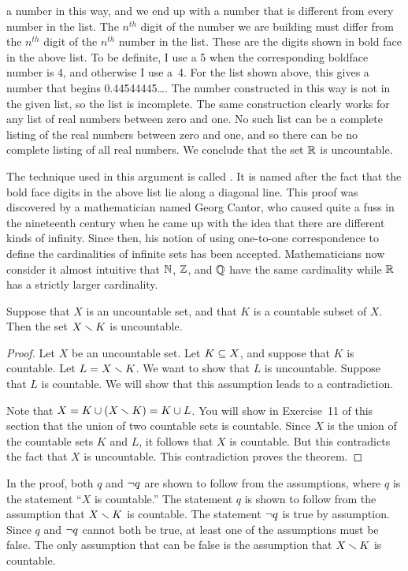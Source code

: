 a number in this way, and we end up with a number that is different
from every number in the list.  The $n^{th}$ digit of the number
we are building must differ from the $n^{th}$ digit of the $n^{th}$ number 
in the list.  These are the digits shown in bold face in the 
above list.  To be definite, I use a 5 when the corresponding
boldface number is 4, and otherwise I use a~4.  For the list
shown above, this gives a number that begins 0.44544445\dots.
The number constructed in this way is not in the given list,
so the list is incomplete.
The same construction clearly works for any list of real numbers
between zero and one.  No such list can be a complete listing
of the real numbers between zero and one, and so there can be
no complete listing of all real numbers.  We conclude that
the set ${\mathbb R}$ is uncountable.

The technique used in this argument is called .
It is named after the fact that the bold face digits in the above
list lie along a diagonal line.   This proof was discovered by
a mathematician named Georg Cantor, who caused quite a fuss in the
nineteenth century when he came up with the idea that there are
different kinds of infinity.  Since then, his notion of using
one-to-one correspondence to define the cardinalities of infinite sets
has been accepted.  Mathematicians now consider it almost intuitive
that ${\mathbb N}$, ${\mathbb Z}$, and ${\mathbb Q}$ have the same cardinality while ${\mathbb R}$
has a strictly larger cardinality.

\medbreak
\begin{theorem}
Suppose that $X$ is an uncountable set, and that $K$ is a countable
subset of $X$.  Then the set $X\smallsetminus K$ is uncountable.
\end{theorem}
\begin{proof}
Let $X$ be an uncountable set.  Let $K\subseteq X$, and suppose that
$K$ is countable.  Let $L=X\smallsetminus K$.  We want to show that
$L$ is uncountable.  Suppose that $L$ is
countable.  We will show that this assumption leads to a contradiction.

Note that $X=K\cup(X\smallsetminus K)=K\cup L$.  You will show in Exercise~11
of this section that the union of two countable
sets is countable.  Since $X$ is the union of the countable
sets $K$ and $L$, it follows that $X$ is countable.  But this
contradicts the fact that $X$ is uncountable.  This contradiction
proves the theorem. 
\end{proof}

In the proof, both $q$ and $\lnot q$ are shown to follow from the
assumptions, where $q$ is the statement ``$X$ is countable.''  The 
statement $q$ is shown to follow from the assumption that $X\smallsetminus K$ 
is countable.  The statement $\lnot q$ is true by assumption.
Since $q$ and $\lnot q$ cannot both be true, at least one of the
assumptions must be false.  The only assumption that can be false
is the assumption that $X\smallsetminus K$ is countable.

